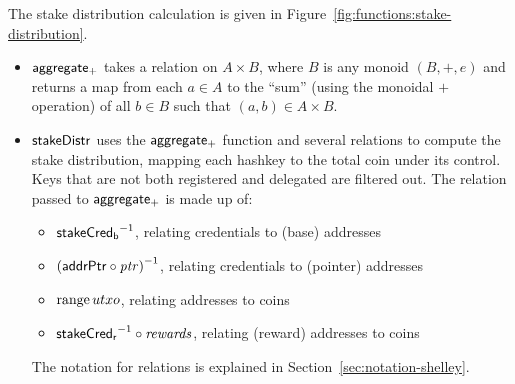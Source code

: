 The stake distribution calculation is given in Figure~\ref{fig:functions:stake-distribution}.

\begin{itemize}
\item $\mathsf{aggregate_{+}}$ takes a relation on $A\times B$, where $B$ is any
  monoid $(B,+,e)$ and returns a map from each $a\in A$ to the ``sum'' (using
  the monoidal $+$ operation) of all $b\in B$ such that $(a, b)\in A\times B$.
\item $\mathsf{stakeDistr}$ uses the $\mathsf{aggregate_{+}}$ function and several relations to
    compute the stake distribution, mapping each hashkey to the total coin under its control.
    Keys that are not both registered and delegated are filtered out.
    The relation passed to $\mathsf{aggregate_{+}}$ is made up of:
    \begin{itemize}
      \item $\mathsf{stakeCred_b}^{-1}$, relating credentials to (base) addresses
      \item $\left(\mathsf{addrPtr}\circ\mathit{ptr}\right)^{-1}$, relating credentials to (pointer)
        addresses
      \item $\operatorname{range}{utxo}$, relating addresses to coins
      \item $\mathsf{stakeCred_r}^{-1}\circ\mathit{rewards}$, relating (reward) addresses to coins
    \end{itemize}
    The notation for relations is explained in Section~\ref{sec:notation-shelley}.
\end{itemize}

